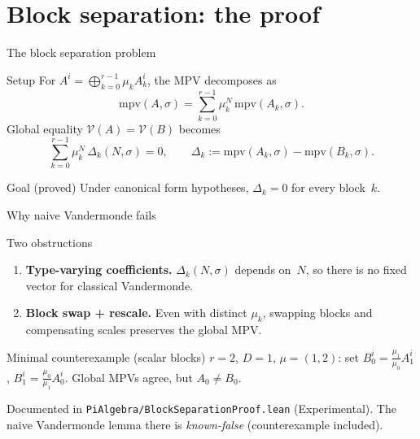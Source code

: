 \documentclass[aspectratio=169,10pt]{beamer}
\begin{document}
\section{Block separation: the proof}

\begin{frame}{The block separation problem}
    \vspace{-0.6em}

    \begin{block}{Setup}
        For $A^i=\bigoplus_{k=0}^{r-1} \mu_k A_k^i$, the MPV decomposes as
        \[
            \mathrm{mpv}(A,\sigma)=\sum_{k=0}^{r-1} \mu_k^N\,\mathrm{mpv}(A_k,\sigma).
        \]
        Global equality $\mathcal{V}(A)=\mathcal{V}(B)$ becomes
        \[
            \sum_{k=0}^{r-1} \mu_k^N\,\Delta_k(N,\sigma)=0,
            \qquad \Delta_k:=\mathrm{mpv}(A_k,\sigma)-\mathrm{mpv}(B_k,\sigma).
        \]
    \end{block}

    \begin{block}{Goal (\textcolor{leangreen}{proved})}
        Under canonical form hypotheses, $\Delta_k=0$ for every block~$k$.
    \end{block}
\end{frame}

\begin{frame}{Why naive Vandermonde fails}
    \vspace{-0.6em}

    \begin{block}{Two obstructions}
        \begin{enumerate}\itemsep0.25em
            \item \textbf{Type-varying coefficients.}
                  $\Delta_k(N,\sigma)$ depends on~$N$,
                  so there is no fixed vector for classical Vandermonde.
            \item \textbf{Block swap + rescale.}
                  Even with distinct $\mu_k$, swapping blocks and compensating scales
                  preserves the global MPV.
        \end{enumerate}
    \end{block}

    \begin{block}{Minimal counterexample (scalar blocks)}
        $r=2$, $D=1$, $\mu=(1,2)$: set $B_0^i=\tfrac{\mu_1}{\mu_0}A_1^i$,
        $B_1^i=\tfrac{\mu_0}{\mu_1}A_0^i$.
        Global MPVs agree, but $A_0\neq B_0$.
    \end{block}

    \textcolor{dimwhite}{\footnotesize Documented in \texttt{PiAlgebra/BlockSeparationProof.lean} (Experimental).
        The naive Vandermonde lemma there is \emph{known-false} (counterexample included).}
\end{frame}
\end{document}
